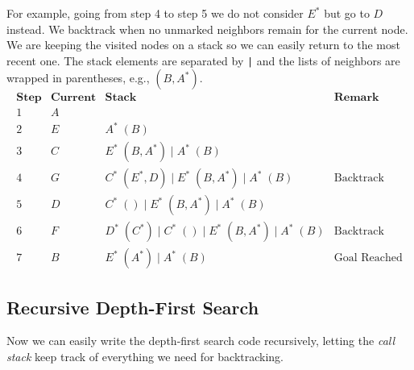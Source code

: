 For example, going from step 4 to step 5 we do not consider $E^*$ but
go to $D$ instead.  We backtrack when no unmarked neighbors remain for
the current node.  We are keeping the visited nodes on a stack so we
can easily return to the most recent one. The stack elements are
separated by \lstinline'|' and the lists of neighbors are wrapped in
parentheses, e.g., $(B,A^*)$.
$$
\begin{array}{ccrll}
   \textbf{Step} & \textbf{Current}%
 & {\textbf{Stack}} & \textbf{Remark}
\\[1ex]
   1 & A %
 &
\\ 2 & E %
 & A^*\; (B)
\\ 3 & C %
 & E^*\; (B,A^*) \mid A^*\; (B)
\\ 4 & G %
 & C^*\; (E^*,D) \mid E^*\; (B,A^*) \mid A^*\; (B)
 & \text{Backtrack}
\\ 5 & D %
 & C^*\;() \mid E^*\;(B, A^*) \mid A^*\;(B)
\\ 6 & F %
 & D^*\;(C^*) \mid C^*\;() \mid E^*\;(B, A^*) \mid A^*\;(B)
 & \text{Backtrack}
\\ 7 & B %
 & E^*\;(A^*) \mid A^*\;(B)
 & \text{Goal Reached}
\end{array}
$$


\subsection{Recursive Depth-First Search}
\label{sec:graphsearch:dfs_recursive}

Now we can easily write the depth-first search code recursively,
letting the \emph{call stack} keep track of everything we need for
backtracking.

